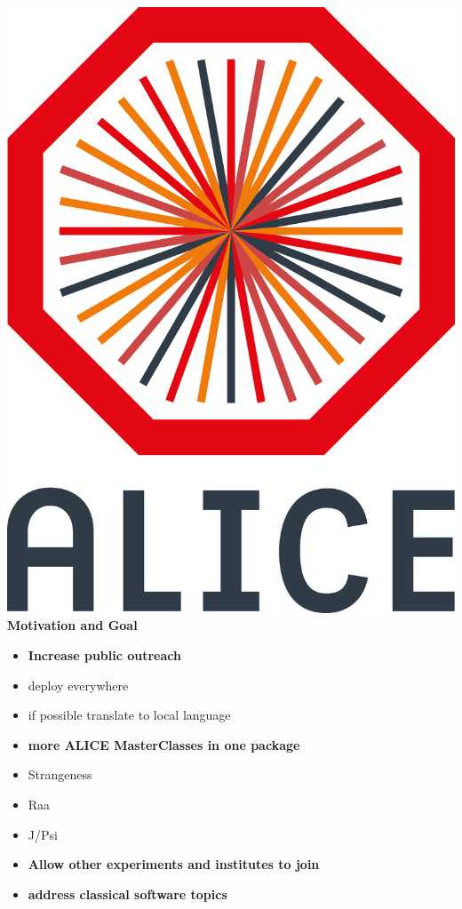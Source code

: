 \documentclass[aspectratio=169,14pt,dvipsnames]{beamer}
\begin{document}
\begin{frame}{\includegraphics[height=0.07\textheight]{2012-Jul-04-4_Color_Logo_CB.png} \hspace{0.2cm}\textbf{Motivation and Goal}}
  \begin{itemize}
    \item<1> \textbf{Increase public outreach}
    \item<1> deploy everywhere
    \item<1> if possible translate to local language

    \item<2> \textbf{more ALICE MasterClasses in one package}
    \item<2> Strangeness
    \item<2> Raa
    \item<2> J/Psi

    \item<3> \textbf{Allow other experiments and institutes to join}
    \item<4> \textbf{address classical software topics}
  \end{itemize}
\end{frame}
\end{document}
